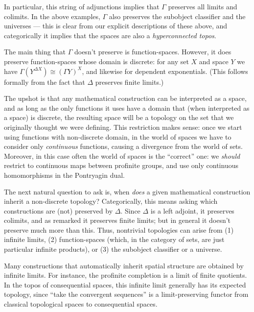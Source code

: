 \documentclass[12pt]{article}
\def\N{\mathbb{N}}
\def\R{\mathbb{R}}
\def\T{\mathcal{T}}
\numberwithin{equation}{section}
\begin{document}
In particular, this string of adjunctions implies that $\Gamma$ preserves all limits and colimits.
In the above examples, $\Gamma$ also preserves the subobject classifier and the universes --- this is clear from our explicit descriptions of these above, and categorically it implies that the spaces are also a \emph{hyperconnected topos}.

The main thing that $\Gamma$ doesn't preserve is function-spaces.
However, it does preserve function-spaces whose domain is discrete: for any set $X$ and space $Y$ we have $\Gamma(Y^{\Delta X}) \cong (\Gamma Y)^X$, and likewise for dependent exponentials.
(This follows formally from the fact that $\Delta$ preserves finite limits.)

The upshot is that any mathematical construction can be interpreted as a space, and as long as the only functions it uses have a domain that (when interpreted as a space) is discrete, the resulting space will be a topology on the set that we originally thought we were defining.
This restriction makes sense: once we start using functions with non-discrete domain, in the world of spaces we have to consider only \emph{continuous} functions, causing a divergence from the world of sets.
Moreover, in this case often the world of spaces is the ``correct'' one: we \emph{should} restrict to continuous maps between profinite groups, and use only continuous homomorphisms in the Pontryagin dual.

The next natural question to ask is, when \emph{does} a given mathematical construction inherit a non-discrete topology?
Categorically, this means asking which constructions are (not) preserved by $\Delta$.
Since $\Delta$ is a left adjoint, it preserves colimits, and as remarked it preserves finite limits; but in general it doesn't preserve much more than this.
Thus, nontrivial topologies can arise from (1) infinite limits,
(2) function-spaces (which, in the category of sets, are just particular infinite products), or (3) the subobject classifier or a universe.

Many constructions that automatically inherit spatial structure are obtained by infinite limits.
For instance, the profinite completion is a limit of finite quotients.
In the topos of consequential spaces, this infinite limit generally has its expected topology, since ``take the convergent sequences'' is a limit-preserving functor from classical topological spaces to consequential spaces.
\end{document}
